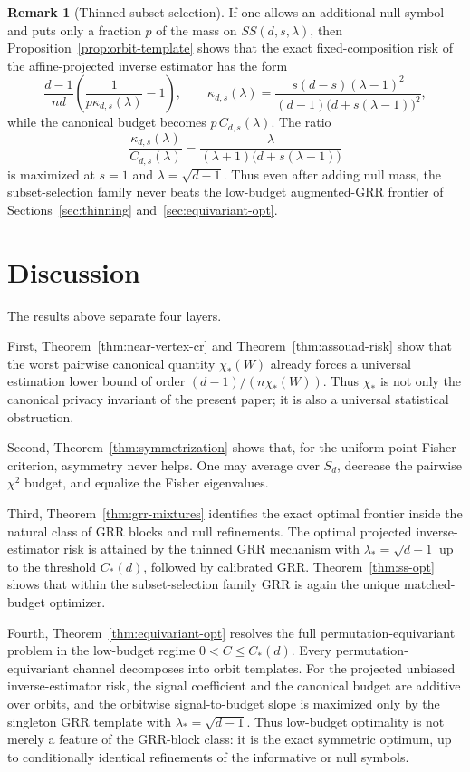 \documentclass[11pt]{amsart}
\numberwithin{equation}{section}
\theoremstyle{definition}
\newtheorem{remark}[theorem]{Remark}
\begin{document}
\begin{remark}[Thinned subset selection]\label{rem:ss-thinned}
If one allows an additional null symbol and puts only a fraction \(p\) of the mass on
\(SS(d,s,\lambda)\), then Proposition~\ref{prop:orbit-template} shows that the exact
fixed-composition risk of the affine-projected inverse estimator has the form
\[
\frac{d-1}{nd}\left(\frac{1}{p\kappa_{d,s}(\lambda)}-1\right),
\qquad
\kappa_{d,s}(\lambda)=
\frac{s(d-s)(\lambda-1)^2}{(d-1)\bigl(d+s(\lambda-1)\bigr)^2},
\]
while the canonical budget becomes \(p\,C_{d,s}(\lambda)\).
The ratio
\[
\frac{\kappa_{d,s}(\lambda)}{C_{d,s}(\lambda)}
=
\frac{\lambda}{(\lambda+1)\bigl(d+s(\lambda-1)\bigr)}
\]
is maximized at \(s=1\) and \(\lambda=\sqrt{d-1}\).
Thus even after adding null mass, the subset-selection family never beats the low-budget
augmented-GRR frontier of Sections~\ref{sec:thinning} and~\ref{sec:equivariant-opt}.
\end{remark}

\section{Discussion}\label{sec:new-discussion}

The results above separate four layers.

First, Theorem~\ref{thm:near-vertex-cr} and Theorem~\ref{thm:assouad-risk} show that the worst pairwise
canonical quantity
\(
\chi_\ast(W)
\)
already forces a universal estimation lower bound of order
\(
(d-1)/(n\chi_\ast(W))
\).
Thus \(\chi_\ast\) is not only the canonical privacy invariant of the present paper; it is also a universal
statistical obstruction.

Second, Theorem~\ref{thm:symmetrization} shows that, for the uniform-point Fisher criterion, asymmetry never
helps.  One may average over \(S_d\), decrease the pairwise \(\chi^2\) budget, and equalize the Fisher
eigenvalues.

Third, Theorem~\ref{thm:grr-mixtures} identifies the exact optimal frontier inside the natural class of GRR
blocks and null refinements.  The optimal projected inverse-estimator risk is attained by the thinned GRR
mechanism with
\(
\lambda_\ast=\sqrt{d-1}
\)
up to the threshold \(C_\ast(d)\), followed by calibrated GRR.
Theorem~\ref{thm:ss-opt} shows that within the subset-selection family GRR is again the unique
matched-budget optimizer.

Fourth, Theorem~\ref{thm:equivariant-opt} resolves the full permutation-equivariant problem in the
low-budget regime \(0<C\le C_\ast(d)\).
Every permutation-equivariant channel decomposes into orbit templates.
For the projected unbiased inverse-estimator risk, the signal coefficient and the canonical budget are
additive over orbits, and the orbitwise signal-to-budget slope is maximized only by the singleton GRR
template with \(\lambda_\ast=\sqrt{d-1}\).
Thus low-budget optimality is not merely a feature of the GRR-block class: it is the exact symmetric
optimum, up to conditionally identical refinements of the informative or null symbols.
\end{document}
